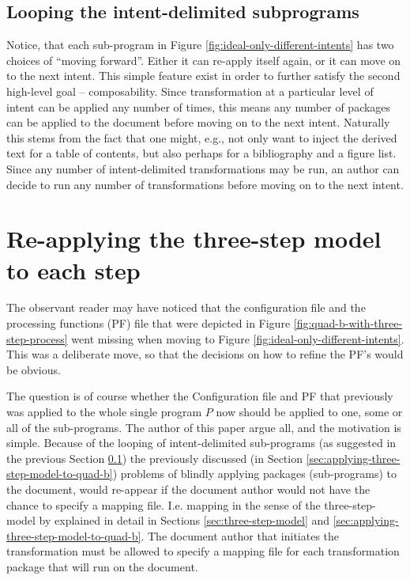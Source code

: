 \documentclass{scrreprt}
\begin{document}
\subsection{Looping the intent-delimited subprograms}
\label{sec:ideal-looping-subprograms}
Notice, that each sub-program in Figure \ref{fig:ideal-only-different-intents} has two choices of ``moving forward''. Either it can re-apply itself again, or it can move on to the next intent. This simple feature exist in order to further satisfy the second high-level goal -- composability. Since transformation at a particular level of intent can be applied any number of times, this means any number of packages can be applied to the document before moving on to the next intent. Naturally this stems from the fact that one might, e.g., not only want to inject the derived text for a table of contents, but also perhaps for a bibliography and a figure list. Since any number of intent-delimited transformations may be run, an author can decide to run any number of transformations before moving on to the next intent.



\section{Re-applying the three-step model to each step}
The observant reader may have noticed that the configuration file and the processing functions (PF) file that were depicted in Figure \ref{fig:quad-b-with-three-step-process} went missing when moving to Figure \ref{fig:ideal-only-different-intents}. This was a deliberate move, so that the decisions on how to refine the PF's would be obvious.

The question is of course whether the Configuration file and PF that previously was applied to the whole single program $P$ now should be applied to one, some or all of the sub-programs. The author of this paper argue all, and the motivation is simple. Because of the looping of intent-delimited sub-programs (as suggested in the previous Section \ref{sec:ideal-looping-subprograms}) the previously discussed (in Section \ref{sec:applying-three-step-model-to-quad-b}) problems of blindly applying packages (sub-programs) to the document, would re-appear if the document author would not have the chance to specify a mapping file. I.e. mapping in the sense of the three-step-model by \citet{goldfarb} explained in detail in Sections \ref{sec:three-step-model} and \ref{sec:applying-three-step-model-to-quad-b}. The document author that initiates the transformation must be allowed to specify a mapping file for each transformation package that will run on the document.
\end{document}
